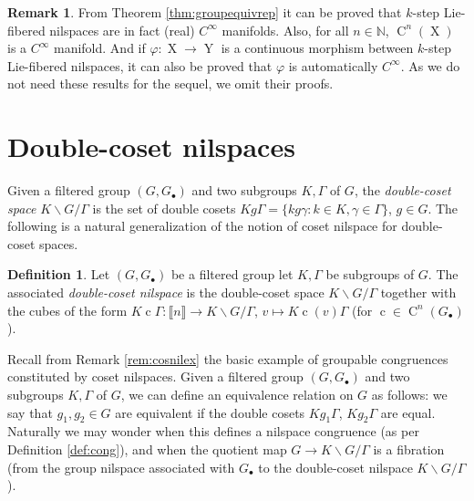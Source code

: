 \documentclass[a4paper,12pt,reqno]{amsart}
\theoremstyle{definition}
\newtheorem{defn}[theorem]{Definition}
\newtheorem{remark}[theorem]{Remark}
\def\to{\rightarrow}
\newcommand*{\db}[1]{\llbracket #1\rrbracket}
\newcommand{\mb}{\mathbb}
\DeclareMathOperator{\q}{c}
\DeclareMathOperator{\ns}{X}
\DeclareMathOperator{\nss}{Y}
\DeclareMathOperator{\cu}{C}
\begin{document}
\begin{remark}
From Theorem \ref{thm:groupequivrep} it can be proved that $k$-step Lie-fibered nilspaces are in fact (real) $C^\infty$ manifolds. Also, for all $n\in \mb{N}$, $\cu^n(\ns)$ is a  $C^\infty$ manifold. And if $\varphi:\ns\to \nss$ is a continuous morphism between $k$-step Lie-fibered nilspaces, it can also be proved that $\varphi$ is automatically $C^\infty$. As we do not need these results for the sequel, we omit their proofs.
\end{remark}


\section{Double-coset nilspaces}\label{sec:DC}

\noindent Given a filtered group $(G,G_\bullet)$ and two subgroups $K,\Gamma$ of $G$, the \emph{double-coset space} $K\backslash G /\Gamma$ is the set of double cosets $K g \Gamma= \{kg\gamma:k\in K,\gamma\in \Gamma\}$, $g\in G$. The following is a natural generalization of the notion of coset nilspace for double-coset spaces.
\begin{defn}\label{def:dcn}
Let $(G,G_\bullet)$ be a filtered group let $K,\Gamma$ be subgroups of $G$. The associated \emph{double-coset nilspace} is the double-coset space $K\backslash G /\Gamma$ together with the cubes of the form $K\q \Gamma: \db{n}\to K\backslash G /\Gamma$, $v \mapsto K\q(v)\Gamma$ (for $\q\in\cu^n(G_\bullet)$).
\end{defn}
Recall from Remark \ref{rem:cosnilex} the basic example of groupable congruences constituted by coset nilspaces. Given a filtered group $(G,G_\bullet)$ and two subgroups $K,\Gamma$ of $G$, we can define an equivalence relation on $G$ as follows: we say that $g_1,g_2\in G$ are equivalent if the double cosets $Kg_1\Gamma$, $Kg_2\Gamma$ are equal. Naturally we may wonder when this defines a nilspace congruence (as per Definition \ref{def:cong}), and when the quotient map $G\to K\backslash G /\Gamma$ is a fibration (from the group nilspace associated with $G_\bullet$ to the double-coset nilspace $K\backslash G /\Gamma$).
\end{document}
